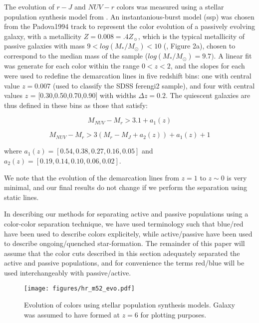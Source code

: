 The evolution of $r-J$ and $NUV-r$ colors was measured using a stellar population synthesis model from \citet{Bruzual2003}. An instantanious-burst model (ssp) was chosen from the Padova1994 track to represent the color evolution of a passively evolving galaxy, with a metallicity $Z=0.008=.4Z_{\sun}$, which is the typical metallicity of passive galaxies with mass $9 < log(M_{*}/M_{\odot}) < 10$ (\citet{Peng2015}, Figure 2a), chosen to correspond to the median mass of the sample ($log(M_{*}/M_{\odot})=9.7)$. A linear fit was generate for each color within the range $0<z<2$, and the slopes for each were used to redefine the demarcation lines in five redshift bins: one with central value $z=0.007$ (used to classify the SDSS ferengi2 sample), and four with central values $z$ = [0.30,0.50,0.70,0.90] with widths $\Delta z=0.2$. The quiescent galaxies are thus defined in these bins as those that satisfy:

\begin{equation}
M_{NUV}-M_{r} > 3.1 + a_{1}(z)
\end{equation}

\begin{equation}
M_{NUV}-M_{r} > 3(M_{r}-M_{J} + a_{2}(z))+ a_{1}(z) + 1  
\end{equation}

where $a_{1}(z) = [0.54,0.38,0.27,0.16,0.05]$ and $a_{2}(z) = [0.19,0.14,0.10,0.06,0.02]$. 


We note that the evolution of the demarcation lines from $z=1$ to $z\sim0$ is very minimal, and our final results do not change if we perform the separation using static lines.


In describing our methods for separating active and passive populations using a color-color separation technique, we have used terminology such that blue/red have been used to describe colors explicitely, while active/passive have been used to describe ongoing/quenched star-formation. The remainder of this paper will assume that the color cuts described in this section adequately separated the active and passive populations, and for convenience the terms red/blue will be used interchangeably with passive/active.  

\begin{figure}
\centering
\texttt{[image: figures/hr\_m52\_evo.pdf]} 
\caption{Evolution of colors using stellar population synthesis models. Galaxy was assumed to have formed at $z=6$ for plotting purposes.}
\label{fig:bcmodel}
\end{figure}


